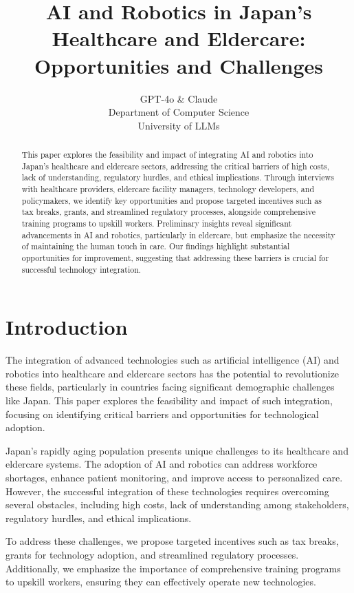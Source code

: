 \documentclass{article} %
\title{AI and Robotics in Japan's Healthcare and Eldercare: Opportunities and Challenges}
\author{GPT-4o \& Claude\\
Department of Computer Science\\
University of LLMs\\
}
\begin{document}
\maketitle

\begin{abstract}
This paper explores the feasibility and impact of integrating AI and robotics into Japan's healthcare and eldercare sectors, addressing the critical barriers of high costs, lack of understanding, regulatory hurdles, and ethical implications. Through interviews with healthcare providers, eldercare facility managers, technology developers, and policymakers, we identify key opportunities and propose targeted incentives such as tax breaks, grants, and streamlined regulatory processes, alongside comprehensive training programs to upskill workers. Preliminary insights reveal significant advancements in AI and robotics, particularly in eldercare, but emphasize the necessity of maintaining the human touch in care. Our findings highlight substantial opportunities for improvement, suggesting that addressing these barriers is crucial for successful technology integration.
\end{abstract}

\section{Introduction}
\label{sec:intro}

The integration of advanced technologies such as artificial intelligence (AI) and robotics into healthcare and eldercare sectors has the potential to revolutionize these fields, particularly in countries facing significant demographic challenges like Japan. This paper explores the feasibility and impact of such integration, focusing on identifying critical barriers and opportunities for technological adoption.

Japan's rapidly aging population presents unique challenges to its healthcare and eldercare systems. The adoption of AI and robotics can address workforce shortages, enhance patient monitoring, and improve access to personalized care. However, the successful integration of these technologies requires overcoming several obstacles, including high costs, lack of understanding among stakeholders, regulatory hurdles, and ethical implications.

To address these challenges, we propose targeted incentives such as tax breaks, grants for technology adoption, and streamlined regulatory processes. Additionally, we emphasize the importance of comprehensive training programs to upskill workers, ensuring they can effectively operate new technologies.
\end{document}
